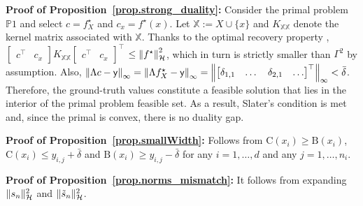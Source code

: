 \begin{my_proof}
	\textbf{Proof of Proposition~\ref{prop.strong_duality}:}
	Consider the primal problem $\mathds{P}1$ and select $c = f^\star_X$ and $c_x = f^\star(x)$. Let $\mathds{X} := X \cup \{x\}$ and $K_{\mathds{X}\mathds{X}}$ denote the kernel matrix associated with $\mathds{X}$. Thanks to the optimal recovery property \cite[Theorem 13.2]{wendland2004scattered}, $\begin{bmatrix} c^\top & c_x \end{bmatrix} K_{\mathds{X}\mathds{X}} \begin{bmatrix} c^\top & c_x \end{bmatrix}^\top$ $\leq \left\| f^\star \right\|_\mathcal{H}^2$, which in turn is strictly smaller than $\Gamma^2$ by assumption. Also, $\left\| \Lambda c - \mathsf{y} \right\|_\infty = \left\| \Lambda f^\star_X - \mathsf{y} \right\|_\infty = \left\| \begin{bmatrix} \delta_{1,1} & \dots & \delta_{2,1} & \dots \end{bmatrix}^\top \right\|_\infty < \bar \delta$. Therefore, the ground-truth values constitute a feasible solution that lies in the interior of the primal problem feasible set. As a result, Slater's condition is met and, since the primal is convex, there is no duality gap.
\end{my_proof} 

\begin{my_proof}
	\textbf{Proof of Proposition~\ref{prop.smallWidth}:}
	Follows from $\text{C}(x_i) \geq \text{B}(x_i)$, $\text{C}(x_i) \leq y_{i,j} + \bar \delta$ and $\text{B}(x_i) \geq y_{i,j} - \bar \delta$ for any $i=1,\dots,d$ and any $j=1,\dots,n_i$. 
\end{my_proof} 

\begin{my_proof}
	\textbf{Proof of Proposition~\ref{prop.norms_mismatch}:}
	It follows from expanding $\Vert s_n \Vert_{\mathcal{H}}^2$ and $\Vert \tilde s_n \Vert_{\mathcal{H}}^2$.
\end{my_proof}

